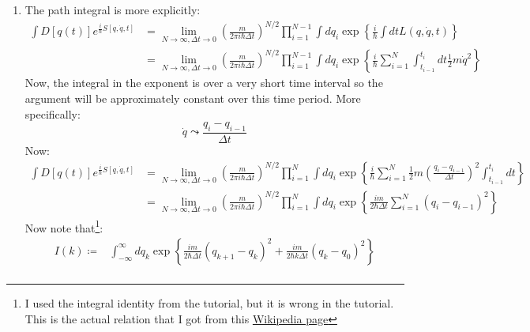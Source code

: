 \documentclass[12pt,a4]{article}
\begin{document}
\begin{enumerate}
\begin{align*}
\begin{matrix}
                        0 &  0 & 0 &  0\\
                        0 &  0 & 0 &  0\\
                        0 &  0 & 0 & -2
                      \end{matrix} \right)
    \end{align*}
  \item
    The path integral is more explicitly:
    \begin{align*}
      \int D[q(t)] e^{\frac{i}{\hbar} S[q, \dot q, t]} &=\lim_{N \to \infty, \Delta t\to 0} \left(\frac{m}{2 \pi i \hbar \Delta t}\right)^{N / 2}\prod_{i = 1}^{N - 1} \int  dq_i \exp\left\{\frac{i}{\hbar}\int dt L(q, \dot q, t)\right\}\\
                                                       &=\lim_{N \to \infty, \Delta t \to 0}\left(\frac{m}{2 \pi i \hbar \Delta t}\right)^{N / 2} \prod_{i = 1}^{N - 1}\int  dq_i \exp\left\{\frac{i}{\hbar}\sum_{i = 1}^{N}\int_{t_{i-1}}^{t_i} dt \frac{1}{2} m \dot q^2\right\}
    \end{align*}
    Now, the integral in the exponent is over a very short time interval so the argument will be approximately constant over this time period.
    More specifically:
    \begin{equation*}
      \dot q \leadsto \frac{q_i - q_{i - 1}}{\Delta t}
    \end{equation*}
    Now:
    \begin{align*}
      \int D[q(t)] e^{\frac{i}{\hbar} S[q, \dot q, t]} &=\lim_{N \to \infty, \Delta t \to 0}\left(\frac{m}{2 \pi i \hbar \Delta t}\right)^{N / 2} \prod_{i = 1}^{N}\int dq_i \exp\left\{\frac{i}{\hbar}\sum_{i = 1}^{N}\frac{1}{2} m \left(\frac{q_i - q_{i - 1}}{\Delta t}\right)^2 \int_{t_{i-1}}^{t_i} dt \right\}\\
                                                       &=\lim_{N \to \infty, \Delta t \to 0}\left(\frac{m}{2 \pi i \hbar \Delta t}\right)^{N / 2} \prod_{i = 1}^{N}\int dq_i \exp\left\{\frac{im}{2\hbar\Delta t}\sum_{i = 1}^{N}\left(q_i - q_{i - 1}\right)^2 \right\}
    \end{align*}
    Now note that\footnote{I used the integral identity from the tutorial, but it is wrong in the tutorial. This is the actual relation that I got from this \href{https://en.wikipedia.org/wiki/Common_integrals_in_quantum_field_theory}{Wikipedia page}}:
    \begin{align*}
      I(k) \coloneqq&\int_{-\infty}^\infty dq_k \exp\left\{\frac{im}{2\hbar \Delta t}\left(q_{k+1} - q_{k}\right)^2 + \frac{im}{2\hbar k\Delta t}\left(q_{k} - q_{0}\right)^2\right\} \\

\end{align*}
\end{enumerate}
\end{document}
